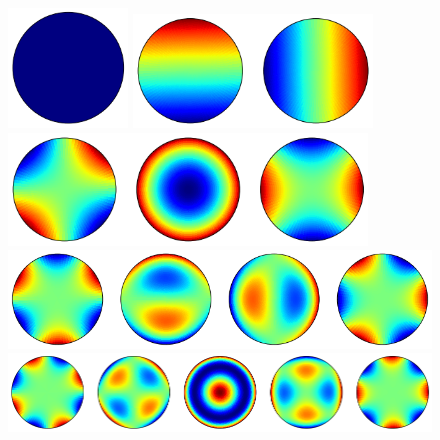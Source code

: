 \documentclass{tufte-handout}
\begin{document}
\begin{figure}[ht]
\centering
\includegraphics[width=1.25in]{img/orthogonal_polynomials_15_0.png}

\includegraphics[width=2.5in]{img/orthogonal_polynomials_15_1.png}

\includegraphics[width=3.75in]{img/orthogonal_polynomials_15_2.png}

\includegraphics[width=5in]{img/orthogonal_polynomials_15_3.png}

\includegraphics[width=6.25in]{img/orthogonal_polynomials_15_4.png}
\end{figure}
\end{document}
